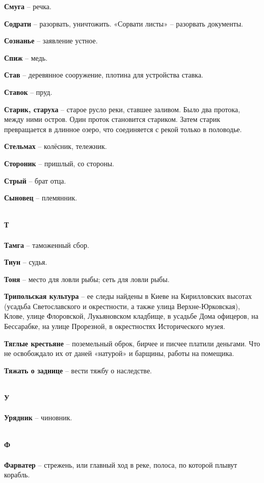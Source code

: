 \begin{multicols}{2}
\textbf{Смуга} – речка.

\textbf{Содрати} – разорвать, уничтожить. «Сорвати листы» – разорвать документы.

\textbf{Сознанье} – заявление устное.

\textbf{Спиж} – медь.

\textbf{Став} – деревянное сооружение, плотина для устройства ставка.

\textbf{Ставок} – пруд.

\textbf{Старик, старуха} – старое русло реки, ставшее заливом. Было два протока, между ними остров. Один проток становится стариком. Затем старик превращается в длинное озеро, что соединяется с рекой только в половодье.

\textbf{Стельмах} – колёсник, тележник.

\textbf{Стороник} – пришлый, со стороны.

\textbf{Стрый} – брат отца.

\textbf{Сыновец} – племянник.

\mbox{ }\\
\textbf{Т\\}
\mbox{ }\\

\textbf{Тамга} – таможенный сбор.

\textbf{Тиун} – судья.

\textbf{Тоня} – место для ловли рыбы; сеть для ловли рыбы.

\textbf{Трипольская культура} – ее следы найдены в Киеве на Кирилловских высотах (усадьба Светославского и окрестности, а также улица Верхне-Юрковская), Клове, улице Флоровской, Лукьяновском кладбище, в усадьбе Дома офицеров, на Бессарабке, на улице Прорезной, в окрестностях Исторического музея.

\textbf{Тяглые крестьяне} – поземельный оброк, бирчее и писчее платили деньгами. Что не освобождало их от даней «натурой» и барщины, работы на помещика.

\textbf{Тяжать о заднице} – вести тяжбу о наследстве.

\mbox{ }\\
\textbf{У\\}
\mbox{ }\\

\textbf{Урядник} – чиновник.

\mbox{ }\\
\textbf{Ф\\}
\mbox{ }\\

\textbf{Фарватер} – стрежень, или главный ход в реке, полоса, по которой плывут корабль.


\end{multicols}
